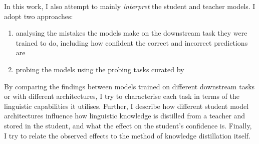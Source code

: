 \documentclass[bsc,frontabs,twoside,singlespacing,parskip,deptreport]{infthesis}
\begin{document}
{{    In this work, I also attempt to mainly \textit{interpret} the student and teacher models. I adopt two approaches:
    \begin{enumerate}
      \item analysing the mistakes the models make on the downstream task they were trained to do, including how confident the correct and incorrect predictions are
      \item probing the models using the probing tasks curated by \citet{Conneau_2018}
    \end{enumerate}
    By comparing the findings between models trained on different downstream tasks or with different architectures, I try to characterise each task in terms of the linguistic capabilities it utilises. 
    Further, I describe how different student model architectures influence how linguistic knowledge is distilled from a teacher and stored in the student, and what the effect on the student's confidence is. 
    Finally, I try to relate the observed effects to the method of knowledge distillation itself.
  }
}
\end{document}
